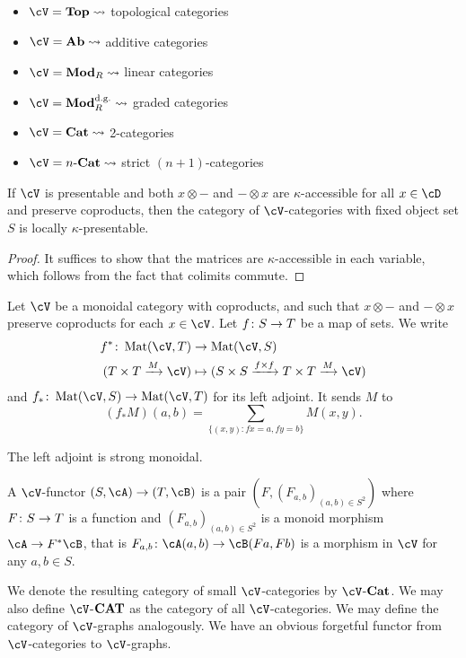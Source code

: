 \documentclass[a4paper,11pt,oneside,openany]{scrbook}
\begin{document}
\begin{exmp}
	\begin{itemize}
		\item $\cV= \Top \leadsto $ topological categories
		\item $\cV= \Ab \leadsto $ additive categories
		\item $\cV= \Mod_R \leadsto $ linear categories
		\item $\cV= \Mod_R^{\text{d.g.}} \leadsto $ graded categories
		\item $\cV= \Cat \leadsto $ 2-categories
		\item $\cV= n\text{-}\Cat \leadsto $ strict $ (n+1) $-categories
	\end{itemize}
\end{exmp}
\begin{prop}
	If $\cV$ is presentable and both $ x\otimes - $ and $ - \otimes x $ are $ \kappa $-accessible for all $ x\in \cD $ and preserve coproducts, then the category of $\cV$-categories with fixed object set $ S $ is locally $ \kappa $-presentable.
\end{prop}
\begin{proof}
	It suffices to show that the matrices are $ \kappa $-accessible in each variable, which follows from the fact that colimits commute.
\end{proof}
\begin{defn}
	Let $\cV$ be a monoidal category with coproducts, and such that $
		x\otimes - $ and $ - \otimes x $ preserve coproducts for each $ x \in\cV$.
	Let $ f \colon S \to T $ be a map of sets.
	We write
	\begin{align*}
		f^* \from \Mat(\cV ,T)          & \to \Mat(\cV, S)                                                            \\
		( T\times T \xrightarrow{M}\cV) & \mapsto ( S\times S \xrightarrow{f \times  f} T\times T \xrightarrow{M}\cV)
	\end{align*}
	and $ f_* \from \Mat(\cV,S)\to \Mat(\cV,T) $ for its left adjoint.
	It sends $ M $ to
	\begin{displaymath}
		(f_* M)(a,b) = \sum_{\{(x,y)\colon fx = a, fy = b \} }M(x,y).
	\end{displaymath}
\end{defn}
\begin{prop}
	The left adjoint is strong monoidal.
\end{prop}
\begin{defn}
	A $\cV$-functor $ (S,\cA) \to (T,\cB) $ is a pair
	$ (F, (F_{a,b})_{(a,b) \in S^2}) $ where $ F\colon S \to T $ is a function and $ (F_{a,b})_{(a,b) \in S^2} $ is a monoid morphism $ \cA \to F^*\cB $, that is $ F_{a,b}\from \cA (a,b) \to \cB (Fa,Fb) $ is a morphism in $\cV$ for any $ a,b \in S $.

	We denote the resulting category of small $\cV$-categories by $\cV$-$ {\normalfont\textbf{Cat}} $. We may also define $\cV$-$ {\normalfont\textbf{CAT}} $ as the category of all $\cV$-categories.
	We may define the category of $\cV$-graphs analogously. We have an
	obvious forgetful functor from $\cV$-categories to $\cV$-graphs.
\end{defn}
\end{document}
